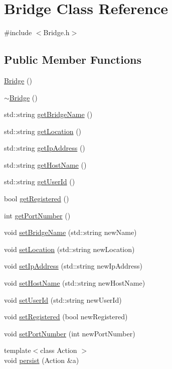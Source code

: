 \hypertarget{class_bridge}{}\section{Bridge Class Reference}
\label{class_bridge}


{\ttfamily \#include $<$Bridge.\+h$>$}

\subsection*{Public Member Functions}
\begin{DoxyCompactItemize}
\item 
\hyperlink{class_bridge_a275f54dafc95c9b5bbaba5e904c4fa9a}{Bridge} ()
\item 
\hyperlink{class_bridge_a812b325fbb4f4b589e68f11f443a7ee4}{$\sim$\+Bridge} ()
\item 
std\+::string \hyperlink{class_bridge_a1f078fc27ba8f0fe400f78f5178355a1}{get\+Bridge\+Name} ()
\item 
std\+::string \hyperlink{class_bridge_a9c807b40340f2469ffad6a8e48bfee73}{get\+Location} ()
\item 
std\+::string \hyperlink{class_bridge_a8d0ebdced1997f8846ade31234a6ea85}{get\+Ip\+Address} ()
\item 
std\+::string \hyperlink{class_bridge_acd998fba0043a2a2adeccd1a5f35bb79}{get\+Host\+Name} ()
\item 
std\+::string \hyperlink{class_bridge_ab74c5db6065cedb1aabb0a6a3775900a}{get\+User\+Id} ()
\item 
bool \hyperlink{class_bridge_a5286a8d45ce04a058c2e15730ee47b7b}{get\+Registered} ()
\item 
int \hyperlink{class_bridge_ac2ec6b055bffee5f813b1f9b70ab086b}{get\+Port\+Number} ()
\item 
void \hyperlink{class_bridge_aa4ddd6d8f8ba9d86bc5f92fda19cc66c}{set\+Bridge\+Name} (std\+::string new\+Name)
\item 
void \hyperlink{class_bridge_a23bd543d54d8b90abfa1b441f3a526ca}{set\+Location} (std\+::string new\+Location)
\item 
void \hyperlink{class_bridge_aa4fd7375d4b6092ca8bbee093dcc1a27}{set\+Ip\+Address} (std\+::string new\+Ip\+Address)
\item 
void \hyperlink{class_bridge_a1a5adca21bbdcdfe78fdd1e2f925d8c2}{set\+Host\+Name} (std\+::string new\+Host\+Name)
\item 
void \hyperlink{class_bridge_a2a68458da56a25afbbe4a8a108eb2f01}{set\+User\+Id} (std\+::string new\+User\+Id)
\item 
void \hyperlink{class_bridge_ac912eac357647d47bc87052da93c45e9}{set\+Registered} (bool new\+Registered)
\item 
void \hyperlink{class_bridge_a0acefccf95c0bf57465241ffe9618491}{set\+Port\+Number} (int new\+Port\+Number)
\item 
{\footnotesize template$<$class Action $>$ }\\void \hyperlink{class_bridge_a20b4d278bc879a5c647e106e03fa1cdc}{persist} (Action \&a)
\end{DoxyCompactItemize}

